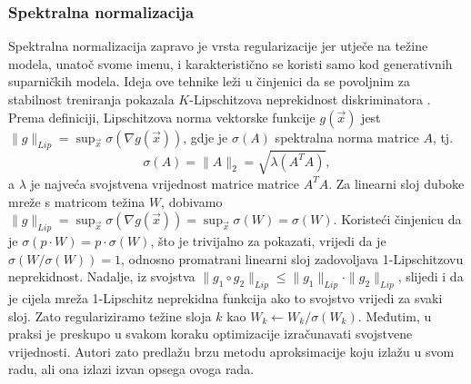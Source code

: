 \subsubsection{Spektralna normalizacija}
Spektralna normalizacija \citep{miyato2018spectral} zapravo je vrsta regularizacije jer utječe na težine modela, unatoč svome imenu, i karakteristično se koristi samo kod generativnih suparničkih modela. Ideja ove tehnike leži u činjenici da se povoljnim za stabilnost treniranja pokazala $K$-Lipschitzova neprekidnost diskriminatora \citep{qi2017losssensitive}. Prema definiciji, Lipschitzova norma vektorske funkcije $g(\vec{x})$ jest $\|g\|_{Lip} = \sup_{\vec{x}}\sigma(\nabla g(\vec{x}))$, gdje je $\sigma(A)$ spektralna norma matrice $A$, tj. 
\begin{equation}
\sigma(A) = \|A\|_2 = \sqrt{\lambda(A^T A)},
\end{equation}
a $\lambda$ je najveća svojstvena vrijednost matrice matrice $A^T A$. Za linearni sloj duboke mreže s matricom težina $W$, dobivamo $\|g\|_{Lip} = \sup_{\vec{x}}\sigma(\nabla g(\vec{x})) = \sup_{\vec{x}}\sigma(W) = \sigma(W)$. Koristeći činjenicu da je $\sigma(p \cdot W) = p \cdot \sigma(W)$, što je trivijalno za pokazati, vrijedi da je $\sigma(W / \sigma(W)) = 1$, odnosno promatrani linearni sloj zadovoljava 1-Lipschitzovu neprekidnost. Nadalje, iz svojstva $\|g_1 \circ g_2\|_{Lip} \leq \|g_1\|_{Lip} \cdot \|g_2\|_{Lip}$, slijedi i da je cijela mreža 1-Lipschitz neprekidna funkcija ako to svojstvo vrijedi za svaki sloj. Zato regulariziramo težine sloja $k$ kao $W_k \leftarrow  W_k / \sigma(W_k)$.
Međutim, u praksi je preskupo u svakom koraku optimizacije izračunavati svojstvene vrijednosti. Autori zato predlažu brzu metodu aproksimacije koju izlažu u svom radu, ali ona izlazi izvan opsega ovoga rada.

